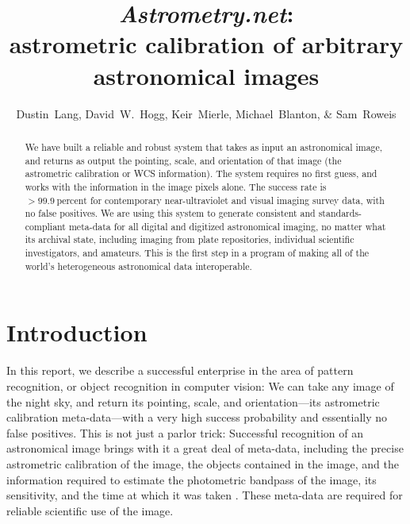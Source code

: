 \documentclass[12pt,preprint]{aastex}
\newcommand{\unit}[1]{\mathrm{#1}}
\newcommand{\percent}{\unit{percent}}
\renewcommand{\%}{\percent}
\begin{document}
\title{\textsl{Astrometry.net}: \\
       astrometric calibration of arbitrary astronomical images}
\author{Dustin~Lang,
        David~W.~Hogg,
        Keir~Mierle,
        Michael~Blanton, \&
        Sam~Roweis
}

\begin{abstract}
We have built a reliable and robust system that takes as input an
astronomical image, and returns as output the pointing, scale, and
orientation of that image (the astrometric calibration or WCS
information).  The system requires no first guess, and works with the
information in the image pixels alone.  The success rate is
$>99.9~\percent$ for contemporary near-ultraviolet and visual imaging
survey data, with no false positives.  We are using this system to
generate consistent and standards-compliant meta-data for all digital
and digitized astronomical imaging, no matter what its archival state,
including imaging from plate repositories, individual scientific
investigators, and amateurs.  This is the first step in a program of
making all of the world's heterogeneous astronomical data
interoperable.
\end{abstract}

\section{Introduction}

In this report, we describe a successful enterprise in the area of
pattern recognition, or object recognition in computer vision: We can
take any image of the night sky, and return its pointing, scale, and
orientation---its astrometric calibration meta-data---with a very high
success probability and essentially no false positives.  This is not
just a parlor trick: Successful recognition of an astronomical image
brings with it a great deal of meta-data, including the precise
astrometric calibration of the image, the objects contained in the
image, and the information required to estimate the photometric
bandpass of the image, its sensitivity, and the time at which it was
taken \cite{barron08b}.  These meta-data are required for reliable
scientific use of the image.
\end{document}
